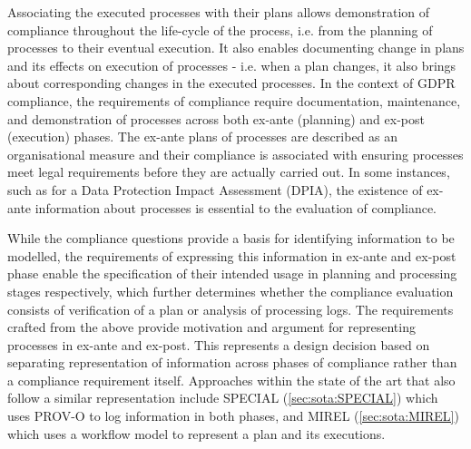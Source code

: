 Associating the executed processes with their plans allows demonstration of compliance throughout the life-cycle of the process, i.e. from the planning of processes to their eventual execution. It also enables documenting change in plans and its effects on execution of processes - i.e. when a plan changes, it also brings about corresponding changes in the executed processes. In the context of GDPR compliance, the requirements of compliance require documentation, maintenance, and demonstration of processes across both ex-ante (planning) and ex-post (execution) phases. The ex-ante plans of processes are described as an organisational measure and their compliance is associated with ensuring processes meet legal requirements before they are actually carried out. In some instances, such as for a Data Protection Impact Assessment (DPIA), the existence of ex-ante information about processes is essential to the evaluation of compliance.

While the compliance questions provide a basis for identifying information to be modelled, the requirements of expressing this information in ex-ante and ex-post phase enable the specification of their intended usage in planning and processing stages respectively, which further determines whether the compliance evaluation consists of verification of a plan or analysis of processing logs. 
The requirements crafted from the above provide motivation and argument for representing processes in ex-ante and ex-post.
This represents a design decision based on separating representation of information across phases of compliance rather than a compliance requirement itself.
Approaches within the state of the art that also follow a similar representation include SPECIAL (\autoref{sec:sota:SPECIAL}) which uses PROV-O to log information in both phases, and MIREL (\autoref{sec:sota:MIREL}) which uses a workflow model to represent a plan and its executions.

